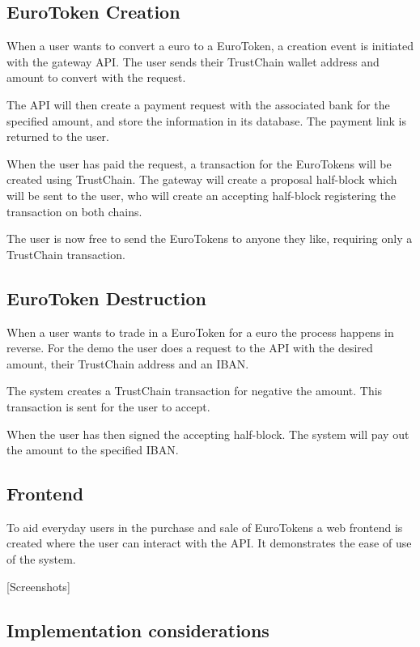 \documentclass[whitelogo]{tudelft-report}
\begin{document}
\subsection{EuroToken Creation}\label{eurotoken-creation}

When a user wants to convert a euro to a EuroToken, a creation event is
initiated with the gateway API. The user sends their TrustChain wallet
address and amount to convert with the request.

The API will then create a payment request with the associated bank for
the specified amount, and store the information in its database. The
payment link is returned to the user.

When the user has paid the request, a transaction for the EuroTokens
will be created using TrustChain. The gateway will create a proposal
half-block which will be sent to the user, who will create an accepting
half-block registering the transaction on both chains.

The user is now free to send the EuroTokens to anyone they like,
requiring only a TrustChain transaction.

\subsection{EuroToken Destruction}\label{eurotoken-destruction}

When a user wants to trade in a EuroToken for a euro the process happens
in reverse. For the demo the user does a request to the API with the
desired amount, their TrustChain address and an IBAN.

The system creates a TrustChain transaction for negative the amount.
This transaction is sent for the user to accept.

When the user has then signed the accepting half-block. The system will
pay out the amount to the specified IBAN.

\subsection{Frontend}\label{frontend}

To aid everyday users in the purchase and sale of EuroTokens a web
frontend is created where the user can interact with the API. It
demonstrates the ease of use of the system.

{[}Screenshots{]}

\subsection{Implementation
considerations}\label{implementation-considerations}
\end{document}
